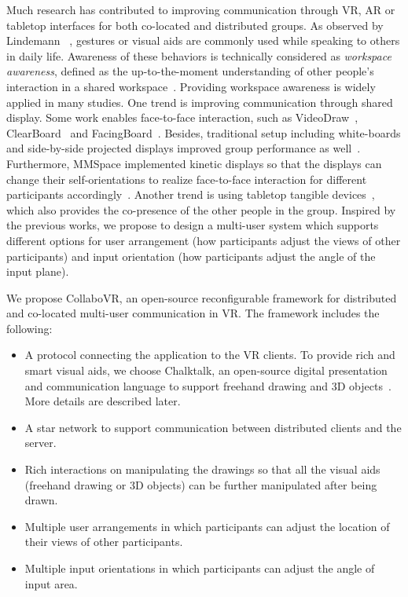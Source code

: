 \documentclass{sigchi}
\begin{document}
Much research has contributed to improving communication through VR, AR or tabletop interfaces for both co-located and distributed groups. As observed by Lindemann ~\cite{tversky2003human}, gestures or visual aids are commonly used while speaking to others in daily life. Awareness of these behaviors is technically considered as \textit{workspace awareness}, defined as the up-to-the-moment understanding of other people's interaction in a shared workspace~\cite{li2014interactive}. Providing workspace awareness is widely applied in many studies. 
One trend is improving communication through shared display. Some work enables face-to-face interaction, such as VideoDraw~\cite{tang1990videodraw}, ClearBoard~\cite{ishii1993integration} and FacingBoard~\cite{li2014interactive}. Besides, traditional setup including white-boards and side-by-side projected displays improved group performance as well~\cite{plaue2009presence}. Furthermore, MMSpace implemented kinetic displays so that the displays can change their self-orientations to realize face-to-face interaction for different participants accordingly~\cite{otsuka2016mmspace}.
Another trend is using tabletop tangible devices~\cite{brave1998tangible, kunert2019multi}, which also provides the co-presence of the other people in the group. Inspired by the previous works, we propose to design a multi-user system which supports different options for user arrangement (how participants adjust the views of other participants) and input orientation (how participants adjust the angle of the input plane).

We propose CollaboVR, an open-source reconfigurable framework for distributed and co-located multi-user communication in VR. The framework includes the following:
\begin{itemize}
    \item A protocol connecting the application to the VR clients. To provide rich and smart visual aids, we choose Chalktalk, an open-source digital presentation and communication language to support freehand drawing and 3D objects~\cite{perlin2018chalktalk}. More details are described later.
    \item A star network to support communication between distributed clients and the server.
    \item Rich interactions on manipulating the drawings so that all the visual aids (freehand drawing or 3D objects) can be further manipulated after being drawn.
    \item Multiple user arrangements in which participants can adjust the location of their views of other participants.
    \item Multiple input orientations in which participants can adjust the angle of input area.
\end{itemize}
\end{document}
